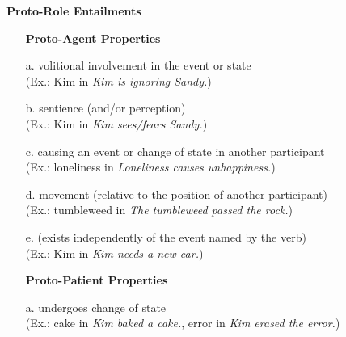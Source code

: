 \documentclass[output=paper,hidelinks]{langscibook}
\begin{document}




 \ea \label{proto-roles}   {\bf Proto-Role
    Entailments}
\begin{itemize}
\item[]  \hspace{-5ex}  {\bf Proto-Agent Properties}

 \item[a.]  volitional involvement in the event or state \\ (Ex.: Kim in {\em
   Kim is ignoring Sandy.})

 \item[b.] sentience (and/or perception) \\ (Ex.: Kim in {\em Kim 
   sees/fears Sandy.}) 

 \item[c.]  causing an event or change of state in another  participant \\
(Ex.: loneliness in {\em Loneliness causes unhappiness.}) 

 \item[d.] movement (relative to the position of another  participant) \\
(Ex.: tumbleweed in {\em The tumbleweed passed the rock.})

 \item[e.] (exists independently of the event named by the  verb)\\
(Ex.: Kim in {\em Kim needs a new car.})  

\vspace{3ex}

 \item[]  \hspace{-5ex}  {\bf Proto-Patient Properties}

 \item[a.]  undergoes change of state \\
(Ex.: cake in {\em Kim baked a cake.}, error in {\em Kim erased the error.})


\end{itemize}
\end{document}
